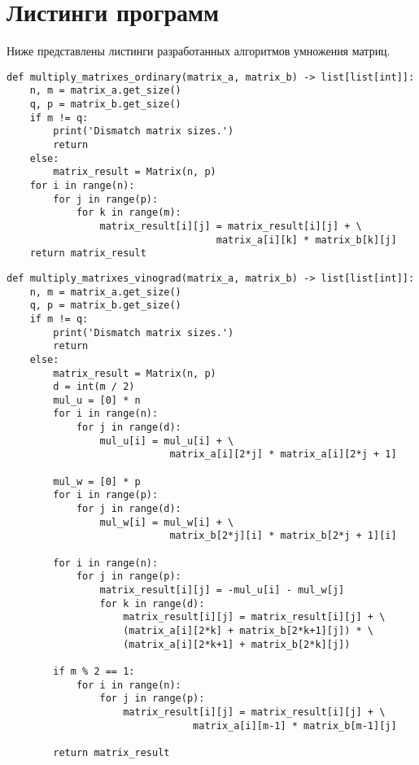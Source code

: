 \section{Листинги программ}
Ниже представлены листинги разработанных алгоритмов умножения матриц.
\newpage
\begin{lstlisting}[label = ordinary_mult, caption=Программный код умножения матриц стандартным способом.]
def multiply_matrixes_ordinary(matrix_a, matrix_b) -> list[list[int]]:
	n, m = matrix_a.get_size()
	q, p = matrix_b.get_size()
	if m != q:
		print('Dismatch matrix sizes.')
		return
	else:
		matrix_result = Matrix(n, p)
	for i in range(n):
		for j in range(p):
			for k in range(m):
				matrix_result[i][j] = matrix_result[i][j] + \
									matrix_a[i][k] * matrix_b[k][j]
	return matrix_result
\end{lstlisting}
\newpage
\begin{lstlisting}[label=vinograd_mult,caption=Программный код умножения матриц по Винограду.]
def multiply_matrixes_vinograd(matrix_a, matrix_b) -> list[list[int]]:
	n, m = matrix_a.get_size()
	q, p = matrix_b.get_size()
	if m != q:
		print('Dismatch matrix sizes.')
		return
	else:
		matrix_result = Matrix(n, p)
		d = int(m / 2)
		mul_u = [0] * n
		for i in range(n):
			for j in range(d):
				mul_u[i] = mul_u[i] + \
							matrix_a[i][2*j] * matrix_a[i][2*j + 1]
		
		mul_w = [0] * p
		for i in range(p):
			for j in range(d):
				mul_w[i] = mul_w[i] + \
							matrix_b[2*j][i] * matrix_b[2*j + 1][i]
		
		for i in range(n):
			for j in range(p):
				matrix_result[i][j] = -mul_u[i] - mul_w[j]
				for k in range(d):
					matrix_result[i][j] = matrix_result[i][j] + \
					(matrix_a[i][2*k] + matrix_b[2*k+1][j]) * \
					(matrix_a[i][2*k+1] + matrix_b[2*k][j])
		
		if m % 2 == 1:
			for i in range(n):
				for j in range(p):
					matrix_result[i][j] = matrix_result[i][j] + \
								matrix_a[i][m-1] * matrix_b[m-1][j]
		
		return matrix_result
\end{lstlisting}
\newpage
